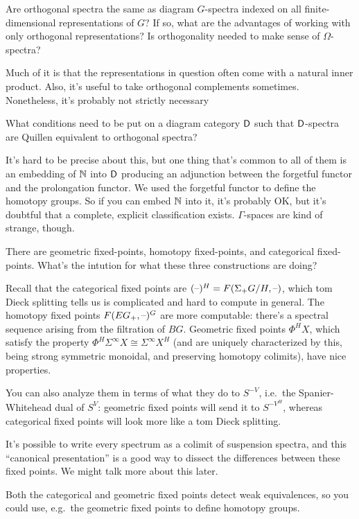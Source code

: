 \begin{ques}
Are orthogonal spectra the same as diagram $G$-spectra indexed on all finite-dimensional representations of $G$? If
so, what are the advantages of working with only orthogonal representations? Is orthogonality needed to make sense
of $\Omega$-spectra?
\end{ques}
Much of it is that the representations in question often come with a natural inner product. Also, it's useful to
take orthogonal complements sometimes. Nonetheless, it's probably not strictly necessary
\begin{ques}
What conditions need to be put on a diagram category $\mathsf D$ such that $\mathsf D$-spectra are Quillen equivalent to
orthogonal spectra?
\end{ques}
It's hard to be precise about this, but one thing that's common to all of them is an embedding of $\mathbb N$ into $\mathsf D$
producing an adjunction between the forgetful functor and the prolongation functor. We used the forgetful functor
to define the homotopy groups. So if you can embed $\mathbb N$ into it, it's probably OK, but it's doubtful that a
complete, explicit classification exists. $\Gamma$-spaces are kind of strange, though.
\begin{ques}
There are geometric fixed-points, homotopy fixed-points, and categorical fixed-points. What's the intution for what
these three constructions are doing?
\end{ques}
Recall that the categorical fixed points are $(\text{--})^H = F(\Sigma_+ G/H,\text{--})$, which tom Dieck splitting tells us is
complicated and hard to compute in general. The homotopy fixed points $F(EG_+,\text{--})^G$ are more computable: there's
a spectral sequence arising from the filtration of $BG$. Geometric fixed points $\Phi^HX$, which satisfy the
property $\Phi^H\Sigma^\infty X \cong \Sigma^\infty X^H$ (and are uniquely characterized by this, being strong
symmetric monoidal, and preserving homotopy colimits), have nice properties.

You can also analyze them in terms of what they do to $S^{-V}$, i.e.\ the Spanier-Whitehead dual of $S^V$:
geometric fixed points will send it to $S^{-V^H}$, whereas categorical fixed points will look more like a tom Dieck
splitting.

It's possible to write every spectrum as a colimit of suspension spectra, and this ``canonical presentation'' is a
good way to dissect the differences between these fixed points. We might talk more about this later.

Both the categorical and geometric fixed points detect weak equivalences, so you could use, e.g.\ the geometric
fixed points to define homotopy groups.

